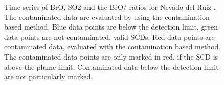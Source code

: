 \documentclass  [
  paper    = a4,
  BCOR     = 10mm,
  twoside,
  fontsize = 12pt,
  fleqn,
  toc      = bibnumbered,
  toc      = listofnumbered,
  numbers  = noendperiod,
  headings = normal,
  listof   = leveldown,
  version  = 3.03
]                                       {scrreprt}
\begin{document}
\begin{figure}
	\centering
	\caption{Time series of BrO, SO2 and the BrO/ ratios for Nevado del Ruiz . The contaminated data are evaluated by using the contamination based method. Blue data points are below the detection limit, green data points are not contaminated, valid  SCDs. Red data points are contaminated data, evaluated with the contamination based method. The contaminated data points are only marked in red, if the  SCD is above the plume limit. Contaminated data below the detection limit are not particularly marked. }
	\label{fig:ndrso2novacsametime}
\end{figure}	
\end{document}
